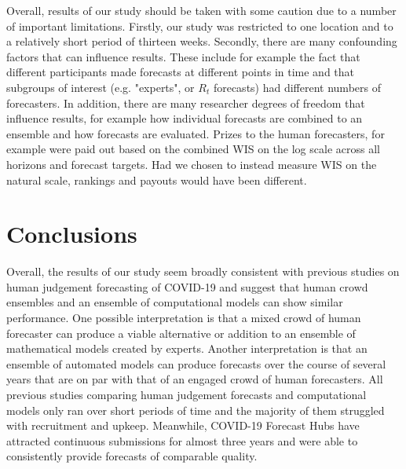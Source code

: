 \documentclass[10pt,a4paper,twocolumn]{article}
\begin{document}

Overall, results of our study should be taken with some caution due to a number of important limitations. Firstly, our study was restricted to one location and to a relatively short period of thirteen weeks. Secondly, there are many confounding factors that can influence results. These include for example the fact that different participants made forecasts at different points in time and that subgroups of interest (e.g. "experts", or $R_t$ forecasts) had different numbers of forecasters. In addition, there are many researcher degrees of freedom that influence results, for example how individual forecasts are combined to an ensemble and how forecasts are evaluated. Prizes to the human forecasters, for example were paid out based on the combined WIS on the log scale across all horizons and forecast targets. Had we chosen to instead measure WIS on the natural scale, rankings and payouts would have been different. 


\section*{Conclusions}

Overall, the results of our study seem broadly consistent with previous studies on human judgement forecasting of COVID-19 and suggest that human crowd ensembles and an ensemble of computational models can show similar performance. One possible interpretation is that a mixed crowd of human forecaster can produce a viable alternative or addition to an ensemble of mathematical models created by experts. Another interpretation is that an ensemble of automated models can produce forecasts over the course of several years that are on par with that of an engaged crowd of human forecasters. All previous studies comparing human judgement forecasts and computational models only ran over short periods of time and the majority of them struggled with recruitment and upkeep. Meanwhile, COVID-19 Forecast Hubs have attracted continuous submissions for almost three years and were able to consistently provide forecasts of comparable quality. 
\end{document}
